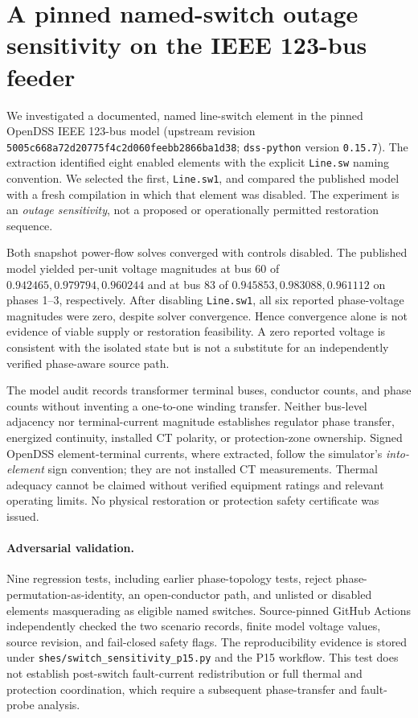 \section{A pinned named-switch outage sensitivity on the IEEE 123-bus feeder}
\label{sec:p15-switch}
We investigated a documented, named line-switch element in the pinned OpenDSS IEEE 123-bus model (upstream revision \texttt{5005c668a72d20775f4c2d060feebb2866ba1d38}; \texttt{dss-python} version \texttt{0.15.7}). The extraction identified eight enabled elements with the explicit \texttt{Line.sw} naming convention. We selected the first, \texttt{Line.sw1}, and compared the published model with a fresh compilation in which that element was disabled. The experiment is an \emph{outage sensitivity}, not a proposed or operationally permitted restoration sequence.

Both snapshot power-flow solves converged with controls disabled. The published model yielded per-unit voltage magnitudes at bus 60 of \(0.942465,0.979794,0.960244\) and at bus 83 of \(0.945853,0.983088,0.961112\) on phases 1--3, respectively. After disabling \texttt{Line.sw1}, all six reported phase-voltage magnitudes were zero, despite solver convergence. Hence convergence alone is not evidence of viable supply or restoration feasibility. A zero reported voltage is consistent with the isolated state but is not a substitute for an independently verified phase-aware source path.

The model audit records transformer terminal buses, conductor counts, and phase counts without inventing a one-to-one winding transfer. Neither bus-level adjacency nor terminal-current magnitude establishes regulator phase transfer, energized continuity, installed CT polarity, or protection-zone ownership. Signed OpenDSS element-terminal currents, where extracted, follow the simulator's \emph{into-element} sign convention; they are not installed CT measurements. Thermal adequacy cannot be claimed without verified equipment ratings and relevant operating limits. No physical restoration or protection safety certificate was issued.

\paragraph{Adversarial validation.}
Nine regression tests, including earlier phase-topology tests, reject phase-permutation-as-identity, an open-conductor path, and unlisted or disabled elements masquerading as eligible named switches. Source-pinned GitHub Actions independently checked the two scenario records, finite model voltage values, source revision, and fail-closed safety flags. The reproducibility evidence is stored under \texttt{shes/switch\_sensitivity\_p15.py} and the P15 workflow. This test does not establish post-switch fault-current redistribution or full thermal and protection coordination, which require a subsequent phase-transfer and fault-probe analysis.